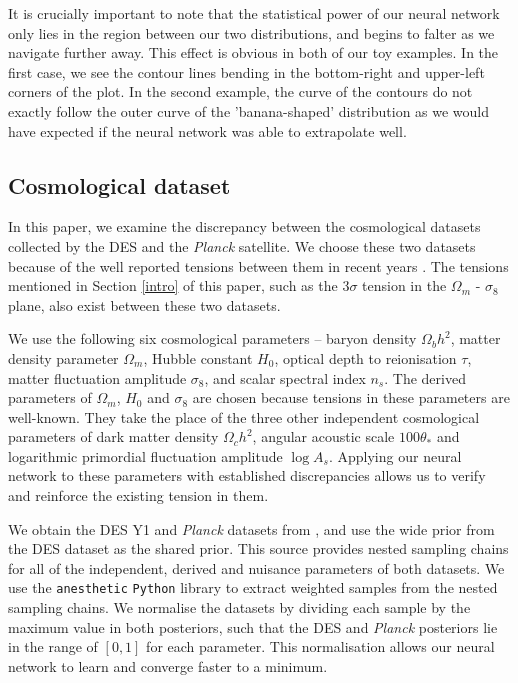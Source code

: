 \documentclass[%
 reprint,
 amsmath,amssymb,
 aps,
]{revtex4-2}
\begin{document}
It is crucially important to note that the statistical power of our neural network only lies in the region between our two distributions, and begins to falter as we navigate further away. This effect is obvious in both of our toy examples. In the first case, we see the contour lines bending in the bottom-right and upper-left corners of the plot. In the second example, the curve of the contours do not exactly follow the outer curve of the 'banana-shaped' distribution as we would have expected if the neural network was able to extrapolate well.


\subsection{Cosmological dataset}

In this paper, we examine the discrepancy between the cosmological datasets collected by the DES and the \textit{Planck} satellite. We choose these two datasets because of the well reported tensions between them in recent years \cite{Handley2019, Lemos2020}. The tensions mentioned in Section \ref{intro} of this paper, such as the $3\sigma$ tension in the $\Omega_m$ - $\sigma_8$ plane, also exist between these two datasets.

We use the following six cosmological parameters -- baryon density $\Omega_b h^2$, matter density parameter $\Omega_m$, Hubble constant $H_0$, optical depth to reionisation $\tau$, matter fluctuation amplitude $\sigma_8$, and scalar spectral index $n_s$. The derived parameters of $\Omega_m$, $H_0$ and $\sigma_8$ are chosen because tensions in these parameters are well-known. They take the place of the three other independent cosmological parameters of dark matter density $\Omega_c h^2$, angular acoustic scale $100 \theta_*$ and logarithmic primordial fluctuation amplitude $\log A_s$. Applying our neural network to these parameters with established discrepancies allows us to verify and reinforce the existing tension in them.

We obtain the DES Y1 and \textit{Planck} datasets from \cite{Dataset}, and use the wide prior from the DES dataset as the shared prior. This source provides nested sampling chains for all of the independent, derived and nuisance parameters of both datasets. We use the \texttt{anesthetic} \texttt{Python} library \cite{anesthetic} to extract weighted samples from the nested sampling chains. We normalise the datasets by dividing each sample by the maximum value in both posteriors, such that the DES and \textit{Planck} posteriors lie in the range of $[0, 1]$ for each parameter. This normalisation allows our neural network to learn and converge faster to a minimum.
\end{document}
